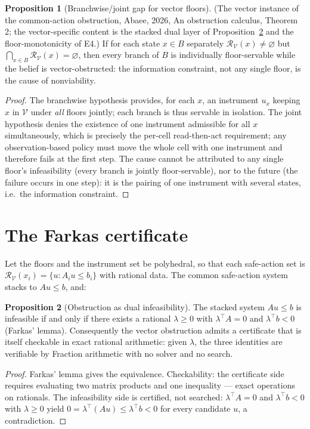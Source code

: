 \documentclass[10pt,twocolumn]{article}
\theoremstyle{definition}
\newtheorem{proposition}{Proposition}
\begin{document}
\begin{proposition}[Branchwise/joint gap for vector floors]
\label{prop:gap}
(The vector instance of the common-action obstruction, Abaee, 2026, An obstruction calculus,
Theorem 2; the vector-specific content is the stacked dual layer of
Proposition~\ref{prop:farkas} and the floor-monotonicity of E4.)
If for each state $x\in B$ separately $\mathcal R_{\mathcal V}(x)\neq
\varnothing$ but $\bigcap_{x\in B}\mathcal R_{\mathcal V}(x)=\varnothing$,
then every branch of $B$ is individually floor-servable while the belief is
vector-obstructed: the information constraint, not any single floor, is the
cause of nonviability.
\end{proposition}
\begin{proof}
The branchwise hypothesis provides, for each $x$, an instrument $u_x$
keeping $x$ in $\mathcal V$ under \emph{all} floors jointly; each branch
is thus servable in isolation. The joint hypothesis denies the existence of
one instrument admissible for all $x$ simultaneously, which is precisely
the per-cell read-then-act requirement; any observation-based policy must
move the whole cell with one instrument and therefore fails at the first
step. The cause cannot be attributed to any single floor's infeasibility
(every branch is jointly floor-servable), nor to the future (the failure
occurs in one step): it is the pairing of one instrument with several
states, i.e.\ the information constraint.
\end{proof}

\section{The Farkas certificate}

Let the floors and the instrument set be polyhedral, so that each
safe-action set is $\mathcal R_{\mathcal V}(x_i)=\{u: A_i u\le b_i\}$ with
rational data. The common safe-action system stacks to $Au\le b$, and:

\begin{proposition}[Obstruction as dual infeasibility]
\label{prop:farkas}
The stacked system $Au\le b$ is infeasible if and only if there exists a
rational $\lambda\ge 0$ with $\lambda^{\top}A=0$ and $\lambda^{\top}b<0$
(Farkas' lemma). Consequently the vector obstruction admits a certificate
that is itself checkable in exact rational arithmetic: given $\lambda$, the
three identities are verifiable by Fraction arithmetic with no solver and
no search.
\end{proposition}
\begin{proof}
Farkas' lemma gives the equivalence. Checkability: the certificate side
requires evaluating two matrix products and one inequality --- exact
operations on rationals. The infeasibility side is certified, not searched:
$\lambda^{\top}A=0$ and $\lambda^{\top}b<0$ with $\lambda\ge0$ yield
$0=\lambda^{\top}(Au)\le\lambda^{\top}b<0$ for every candidate $u$, a
contradiction.
\end{proof}
\end{document}
